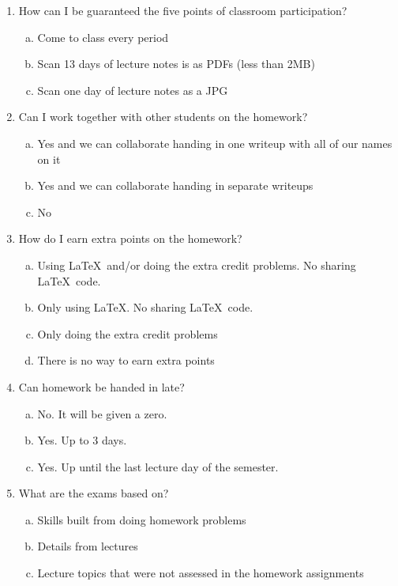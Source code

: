 \documentclass[12pt]{article}
\begin{document}
\begin{enumerate}[1.]
\item How can I be guaranteed the five points of classroom participation?

\begin{enumerate}[(a)]
\item Come to class every period
\item Scan 13 days of lecture notes is as PDFs (less than 2MB)
\item Scan one day of lecture notes as a JPG
\end{enumerate}

\item Can I work together with other students on the homework?

\begin{enumerate}[(a)]
\item Yes and we can collaborate handing in one writeup with all of our names on it
\item Yes and we can collaborate handing in separate writeups
\item No
\end{enumerate}

\item How do I earn extra points on the homework?

\begin{enumerate}[(a)]
\item Using \LaTeX ~and/or doing the extra credit problems. No sharing \LaTeX~code.
\item Only using \LaTeX . No sharing \LaTeX~code.
\item Only doing the extra credit problems
\item There is no way to earn extra points
\end{enumerate}

\item Can homework be handed in late?

\begin{enumerate}[(a)]
\item No. It will be given a zero.
\item Yes. Up to 3 days.
\item Yes. Up until the last lecture day of the semester.
\end{enumerate}


\item What are the exams based on?

\begin{enumerate}[(a)]
\item Skills built from doing homework problems
\item Details from lectures
\item Lecture topics that were not assessed in the homework assignments
\end{enumerate}


\end{enumerate}
\end{document}
